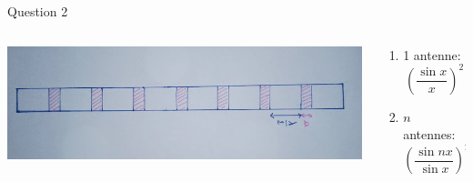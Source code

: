 \documentclass{beamer}
\begin{document}
\begin{frame}{Question 2}
	\begin{columns}
		\begin{column}{0.40\textwidth}
			\begin{center}
	    		\includegraphics[scale=0.25, angle=90]{Question2.png}
        		\end{center}
        	\end{column}
        	\begin{column}{0.40\textwidth}
			\begin{center}
	    \begin{enumerate}
	    \item 1 antenne:$$ \left( \frac{\sin x}{x}\right)^2$$
	    \item $n$ antennes: $$ \left( \frac{\sin nx}{\sin x}\right)^2 \cdot \left( \frac{\sin x}{x}\right)$$
	    \end{enumerate}
        	\end{center}
        	\end{column}
        	\end{columns}
\end{frame}
\end{document}
